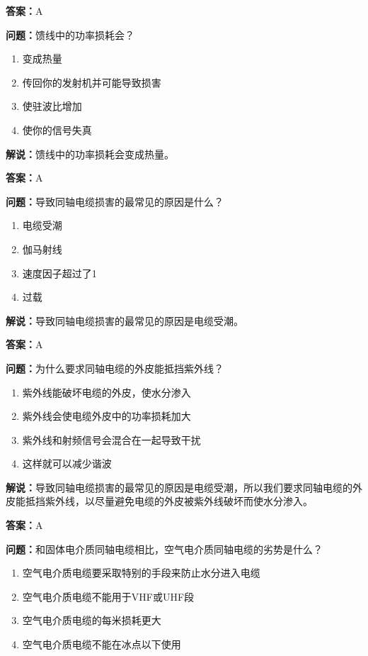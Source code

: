 \textbf{答案：}A

\textbf{问题：}馈线中的功率损耗会？

\begin{enumerate}[label=\Alph*), leftmargin=3em]
	\item 变成热量
	\item 传回你的发射机并可能导致损害
	\item 使驻波比增加
	\item 使你的信号失真
\end{enumerate}

\textbf{解说：}馈线中的功率损耗会变成热量。%

\textbf{答案：}A

\textbf{问题：}导致同轴电缆损害的最常见的原因是什么？

\begin{enumerate}[label=\Alph*), leftmargin=3em]
	\item 电缆受潮
	\item 伽马射线
	\item 速度因子超过了1
	\item 过载
\end{enumerate}

\textbf{解说：}导致同轴电缆损害的最常见的原因是电缆受潮。%

\textbf{答案：}A

\textbf{问题：}为什么要求同轴电缆的外皮能抵挡紫外线？

\begin{enumerate}[label=\Alph*), leftmargin=3em]
	\item 紫外线能破坏电缆的外皮，使水分渗入
	\item 紫外线会使电缆外皮中的功率损耗加大
	\item 紫外线和射频信号会混合在一起导致干扰
	\item 这样就可以减少谐波
\end{enumerate}

\textbf{解说：}导致同轴电缆损害的最常见的原因是电缆受潮，所以我们要求同轴电缆的外皮能抵挡紫外线，以尽量避免电缆的外皮被紫外线破坏而使水分渗入。%

\textbf{答案：}A

\textbf{问题：}和固体电介质同轴电缆相比，空气电介质同轴电缆的劣势是什么？

\begin{enumerate}[label=\Alph*), leftmargin=3em]
	\item 空气电介质电缆要采取特别的手段来防止水分进入电缆
	\item 空气电介质电缆不能用于VHF或UHF段
	\item 空气电介质电缆的每米损耗更大
	\item 空气电介质电缆不能在冰点以下使用
\end{enumerate}

